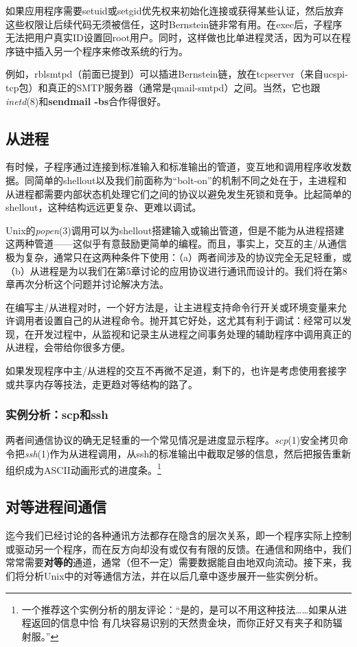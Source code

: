 \documentclass[12pt,oneside]{book}
\begin{document}
\begin{common-format}
如果应用程序需要setuid或setgid优先权来初始化连接或获得某些认证，然后放弃这些权限让后续代码无须被信任，这时Bernstein链非常有用。在exec后，子程序无法把用户真实ID设置回root用户。同时，这样做也比单进程灵活，因为可以在程序链中插入另一个程序来修改系统的行为。

例如，rblsmtpd（前面已提到）可以插进Bernstein链，放在tcpserver（来自ucspi-tcp包）和真正的SMTP服务器（通常是qmail-smtpd）之间。当然，它也跟\textit{inetd}(8)和\textbf{sendmail -bs}合作得很好。


\subsection{从进程}
有时候，子程序通过连接到标准输入和标准输出的管道，变互地和调用程序收发数据。同简单的shellout以及我们前面称为“bolt-on”的机制不同之处在于，主进程和从进程都需要内部状态机处理它们之间的协议以避免发生死锁和竞争。比起简单的shellout，这种结构远远更复杂、更难以调试。

Unix的\textit{popen}(3)调用可以为shellout搭建输入或输出管道，但是不能为从进程搭建这两种管道——这似乎有意鼓励更简单的编程。而且，事实上，交互的主/从通信极为复杂，通常只在这两种条件下使用：（a）两者间涉及的协议完全无足轻重，或（b）从进程是为以我们在第5章讨论的应用协议进行通讯而设计的。我们将在第8章再次分析这个问题并讨论解决方法。

在编写主/从进程对时，一个好方法是，让主进程支持命令行开关或环境变量来允许调用者设置自己的从进程命令。抛开其它好处，这尤其有利于调试：经常可以发现，在开发过程中，从监视和记录主从进程之间事务处理的辅助程序中调用真正的从进程，会带给你很多方便。

如果发现程序中主/从进程的交互不再微不足道，剩下的，也许是考虑使用套接字或共享内存等技法，走更趋对等结构的路了。


\subsubsection{实例分析：scp和ssh}
两者间通信协议的确无足轻重的一个常见情况是进度显示程序。\textit{scp}(1)安全拷贝命令把\textit{ssh}(1)作为从进程调用，从ssh的标准输出中截取足够的信息，然后把报告重新组织成为ASCII动画形式的进度条。\footnote{一个推荐这个实例分析的朋友评论：“是的，是可以不用这种技法……如果从进程返回的信息中恰
有几块容易识别的天然贵金块，而你正好又有夹子和防辐射服。”}


\subsection{对等进程间通信}
迄今我们已经讨论的各种通讯方法都存在隐含的层次关系，即一个程序实际上控制或驱动另一个程序，而在反方向却没有或仅有有限的反馈。在通信和网络中，我们常常需要\textbf{对等的}通道，通常（但不一定）需要数据能自由地双向流动。接下来，我们将分析Unix中的对等通信方法，并在以后几章中逐步展开一些实例分析。



\end{common-format}
\end{document}

